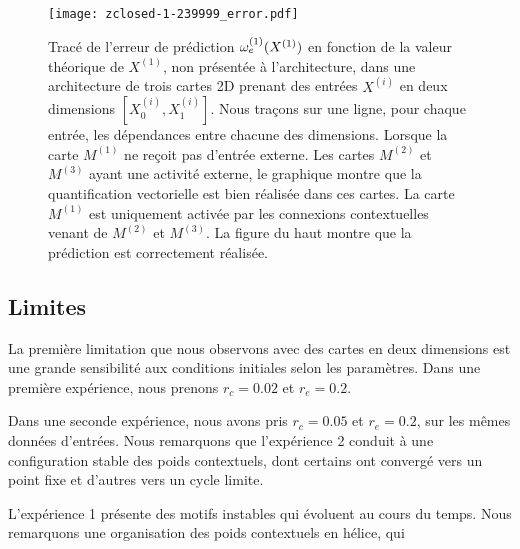 \documentclass[../main]{subfiles}
\begin{document}
\begin{figure}
\texttt{[image: zclosed-1-239999\_error.pdf]}
\caption{Tracé de l'erreur de prédiction $\omega_e^{({1})}(X^{({1})})$ en fonction de la valeur théorique de $X^{(1)}$, non présentée à l'architecture, dans une architecture de trois cartes 2D prenant des entrées $X^{(i)}$ en deux dimensions $[X^{(i)}_0, X^{(i)}_1]$. Nous traçons sur une ligne, pour chaque entrée, les dépendances entre chacune des dimensions.
Lorsque la carte $M^{(1)}$ ne reçoit pas d'entrée externe. Les cartes $M^{(2)}$ et $M^{(3)}$ ayant une activité externe, le graphique montre que la quantification vectorielle est bien réalisée dans ces cartes. La carte $M^{(1)}$ est uniquement activée par les connexions contextuelles venant de $M^{(2)}$ et $M^{(3)}$. La figure du haut montre que la prédiction est correctement réalisée.}
\end{figure}

\subsection{Limites}

La première limitation que nous observons avec des cartes en deux dimensions est une grande sensibilité aux conditions initiales selon les paramètres. 
Dans une première expérience, nous prenons $r_c = 0.02$ et $r_e = 0.2$.

Dans une seconde expérience, nous avons pris $r_c = 0.05$ et $r_e = 0.2$, sur les mêmes données d'entrées. 
Nous remarquons que l'expérience 2 conduit à une configuration stable des poids contextuels, dont certains ont convergé vers un point fixe et d'autres vers un cycle limite. 

L'expérience 1 présente des motifs instables qui évoluent au cours du temps. Nous remarquons une organisation des poids contextuels en hélice, qui 






\ifSubfilesClassLoaded{
    \printbibliography
}{}
\end{document}
